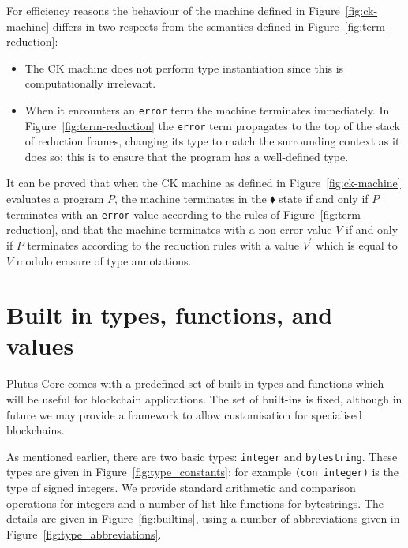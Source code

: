 \documentclass[a4paper]{article}
\begin{document}
For efficiency reasons the behaviour of the machine defined in
Figure~\ref{fig:ck-machine} differs in two respects from the semantics
defined in Figure~\ref{fig:term-reduction}:
\begin{itemize}
\item The CK machine does not perform type instantiation since this
  is computationally irrelevant.
\item When it encounters an \texttt{error} term the machine terminates
  immediately.  In Figure~\ref{fig:term-reduction} the \texttt{error}
  term propagates to the top of the stack of reduction frames,
  changing its type to match the surrounding context as it does so:
  this is to ensure that the program has a well-defined type.
\end{itemize}
\noindent It can be proved that when the CK machine as defined in
Figure~\ref{fig:ck-machine} evaluates a program $P$, the machine
terminates in the $\blacklozenge$ state if and only if $P$ terminates
with an \texttt{error} value according to the rules of
Figure~\ref{fig:term-reduction}, and that the machine terminates with
a non-error value $V$ if and only if $P$ terminates according to the
reduction rules with a value $V^{\prime}$ which is equal to $V$
modulo erasure of type annotations.


\section{Built in types, functions, and values}
\label{sec:builtins}
Plutus Core comes with a predefined set of built-in types and
functions which will be useful for blockchain applications.  The set
of built-ins is fixed, although in future we may provide a framework
to allow customisation for specialised blockchains.

As mentioned earlier, there are two basic types: \texttt{integer} and
\texttt{bytestring}.  These types are given in
Figure~\ref{fig:type_constants}: for example \texttt{(con
  integer)} is the type of signed integers.
We provide standard arithmetic and comparison operations for integers
and a number of list-like functions for bytestrings. The details are
given in Figure~\ref{fig:builtins}, using a number of
abbreviations given in Figure~\ref{fig:type_abbreviations}.
\end{document}

